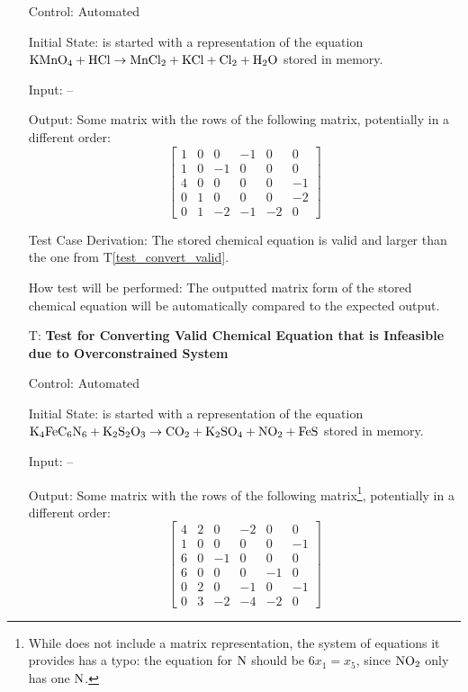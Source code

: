 \documentclass[12pt, titlepage]{article}
\newcounter{testnum} %
\newcommand{\testref}[1]{T\ref{#1}}
\begin{document}
\begin{enumerate}
    Control: Automated

    Initial State: \progname{} is started with a representation of the equation
    $\ce{KMnO4} + \ce{HCl} \rightarrow \ce{MnCl2} + \ce{KCl} + \ce{Cl2} +
      \ce{H2O}$ \cite{taylor_balancing_2021} stored in memory.

    Input: --

    Output: Some matrix with the rows of the following matrix, potentially in a
    different order:
    $$\begin{bmatrix}
        1 & 0 & 0  & -1 & 0  & 0  \\
        1 & 0 & -1 & 0  & 0  & 0  \\
        4 & 0 & 0  & 0  & 0  & -1 \\
        0 & 1 & 0  & 0  & 0  & -2 \\
        0 & 1 & -2 & -1 & -2 & 0
      \end{bmatrix}$$

    Test Case Derivation: The stored chemical equation is
    valid and larger than the one from \testref{test_convert_valid}.

    How test will be performed: The outputted matrix form of the stored
    chemical equation will be automatically compared to the expected output.

  \item[T\refstepcounter{testnum}\thetestnum \label{test_convert_inf_over_valid}:]
    \textbf{Test for Converting Valid Chemical Equation that is Infeasible due
      to Overconstrained System}

    Control: Automated

    Initial State: \progname{} is started with a representation of the equation
    $\ce{K4FeC6N6} + \ce{K2S2O3} \rightarrow \ce{CO2} + \ce{K2SO4} + \ce{NO2} +
      \ce{FeS}$ \cite{hamid_balancing_2019} stored in memory.

    Input: --

    Output: Some matrix with the rows of the following matrix\footnote{While
      \cite{hamid_balancing_2019} does not include a matrix representation, the
      system of equations it provides has a typo: the equation for $\ce{N}$
      should be $6x_1 = x_5$, since $\ce{NO2}$ only has one $\ce{N}$.},
    potentially in a different order:
    $$\begin{bmatrix}
        4 & 2 & 0  & -2 & 0  & 0  \\
        1 & 0 & 0  & 0  & 0  & -1 \\
        6 & 0 & -1 & 0  & 0  & 0  \\
        6 & 0 & 0  & 0  & -1 & 0  \\
        0 & 2 & 0  & -1 & 0  & -1 \\
        0 & 3 & -2 & -4 & -2 & 0
      \end{bmatrix}$$


\end{enumerate}
\end{document}
